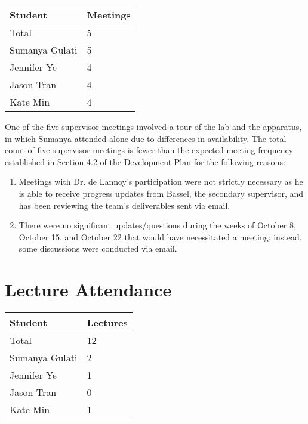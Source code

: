 \documentclass{article}
\begin{document}
\begin{table}[H]
\centering
\begin{tabular}{ll}
\toprule
\textbf{Student} & \textbf{Meetings}\\
\midrule
Total & 5\\
Sumanya Gulati & 5\\
Jennifer Ye & 4\\
Jason Tran & 4\\
Kate Min & 4\\
\bottomrule
\end{tabular}
\end{table}

One of the five supervisor meetings involved a tour of the lab and the
apparatus, in which Sumanya attended alone due to differences in availability.
The total count of five supervisor meetings is fewer than the expected meeting
frequency established in Section 4.2 of the
\href{https://github.com/SumanyaG/Alkalytics/blob/main/docs/DevelopmentPlan/DevelopmentPlan.pdf}{Development
Plan} for the following reasons:
\begin{enumerate}
	\item Meetings with Dr. de Lannoy's participation were not strictly
	necessary as he is able to receive progress updates from Bassel, the
	secondary supervisor, and has been reviewing the team's deliverables sent
	via email. 
	\item There were no significant updates/questions during the weeks of
	October 8, October 15, and October 22 that would have necessitated a
	meeting; instead, some discussions were conducted via email.
\end{enumerate}

\section{Lecture Attendance}

\begin{table}[H]
\centering
\begin{tabular}{ll}
\toprule
\textbf{Student} & \textbf{Lectures}\\
\midrule
Total & 12\\
Sumanya Gulati & 2\\
Jennifer Ye & 1\\
Jason Tran & 0\\
Kate Min & 1\\
\bottomrule
\end{tabular}
\end{table}
\end{document}
